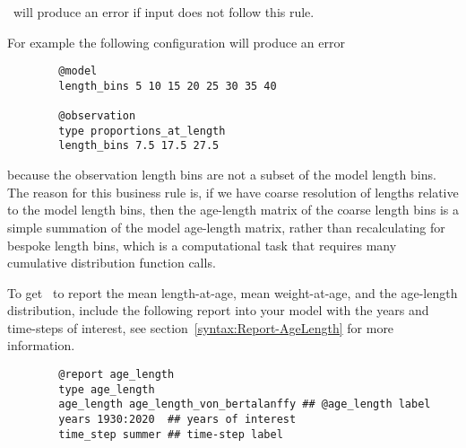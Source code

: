 \CNAME\ will produce an error if input does not follow this rule.

For example the following configuration will produce an error

{\small{\begin{verbatim}
		@model
		length_bins 5 10 15 20 25 30 35 40 
		
		@observation 
		type proportions_at_length
		length_bins 7.5 17.5 27.5
		\end{verbatim}}}

because the observation length bins are not a subset of the model length bins. The reason for this business rule is, if we have coarse resolution of lengths relative to the model length bins, then the age-length matrix of the coarse length bins is a simple summation of the model age-length matrix, rather than recalculating for bespoke length bins, which is a computational task that requires many cumulative distribution function calls.

To get \CNAME\ to report the mean length-at-age, mean weight-at-age, and the age-length distribution, include the following report into your model with the years and time-steps of interest, see section~\ref{syntax:Report-AgeLength} for more information.

{\small{\begin{verbatim}
		@report age_length
		type age_length 
		age_length age_length_von_bertalanffy ## @age_length label
		years 1930:2020  ## years of interest
		time_step summer ## time-step label
		\end{verbatim}}}
	